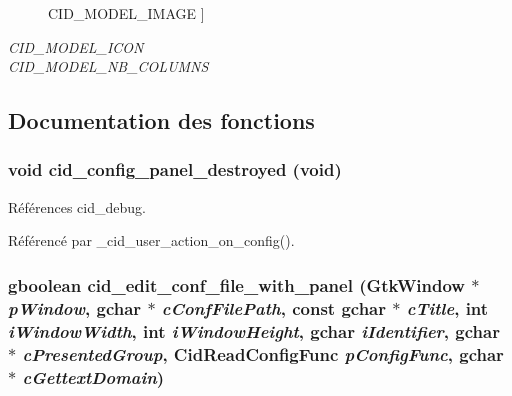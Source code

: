 \begin{Desc}
\begin{description}
{CID\_\-MODEL\_\-IMAGE\label{cid-conf-panel-factory_8h_fe1377534bbddb2652fff16a64b28f4b08071a4cc1e47748d969c5cbd3d45dc3}
}]\item[{\em 
CID\_\-MODEL\_\-ICON\label{cid-conf-panel-factory_8h_fe1377534bbddb2652fff16a64b28f4b555b0df6efff5aa81e16539cff668f84}
}]\item[{\em 
CID\_\-MODEL\_\-NB\_\-COLUMNS\label{cid-conf-panel-factory_8h_fe1377534bbddb2652fff16a64b28f4bd71bdd32bc6d4223a16580041dede2ac}
}]\end{description}
\end{Desc}



\subsection{Documentation des fonctions}
\subsubsection{\setlength{\rightskip}{0pt plus 5cm}void cid\_\-config\_\-panel\_\-destroyed (void)}\label{cid-conf-panel-factory_8h_dea878f4c7dd9508f463739dc306f3a1}




Références cid\_\-debug.

Référencé par \_\-cid\_\-user\_\-action\_\-on\_\-config().
\subsubsection{\setlength{\rightskip}{0pt plus 5cm}gboolean cid\_\-edit\_\-conf\_\-file\_\-with\_\-panel (GtkWindow $\ast$ {\em pWindow}, \/  gchar $\ast$ {\em cConfFilePath}, \/  const gchar $\ast$ {\em cTitle}, \/  int {\em iWindowWidth}, \/  int {\em iWindowHeight}, \/  gchar {\em iIdentifier}, \/  gchar $\ast$ {\em cPresentedGroup}, \/  {\bf CidReadConfigFunc} {\em pConfigFunc}, \/  gchar $\ast$ {\em cGettextDomain})}\label{cid-conf-panel-factory_8h_527e5da831d6d9f18f2739316bfda493}




